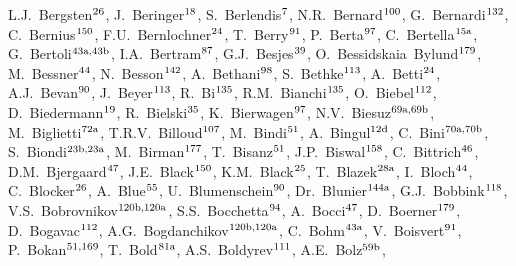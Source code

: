 \begin{flushleft}
L.J.~Bergsten$^\textrm{\scriptsize 26}$,    
J.~Beringer$^\textrm{\scriptsize 18}$,    
S.~Berlendis$^\textrm{\scriptsize 7}$,    
N.R.~Bernard$^\textrm{\scriptsize 100}$,    
G.~Bernardi$^\textrm{\scriptsize 132}$,    
C.~Bernius$^\textrm{\scriptsize 150}$,    
F.U.~Bernlochner$^\textrm{\scriptsize 24}$,    
T.~Berry$^\textrm{\scriptsize 91}$,    
P.~Berta$^\textrm{\scriptsize 97}$,    
C.~Bertella$^\textrm{\scriptsize 15a}$,    
G.~Bertoli$^\textrm{\scriptsize 43a,43b}$,    
I.A.~Bertram$^\textrm{\scriptsize 87}$,    
G.J.~Besjes$^\textrm{\scriptsize 39}$,    
O.~Bessidskaia~Bylund$^\textrm{\scriptsize 179}$,    
M.~Bessner$^\textrm{\scriptsize 44}$,    
N.~Besson$^\textrm{\scriptsize 142}$,    
A.~Bethani$^\textrm{\scriptsize 98}$,    
S.~Bethke$^\textrm{\scriptsize 113}$,    
A.~Betti$^\textrm{\scriptsize 24}$,    
A.J.~Bevan$^\textrm{\scriptsize 90}$,    
J.~Beyer$^\textrm{\scriptsize 113}$,    
R.~Bi$^\textrm{\scriptsize 135}$,    
R.M.~Bianchi$^\textrm{\scriptsize 135}$,    
O.~Biebel$^\textrm{\scriptsize 112}$,    
D.~Biedermann$^\textrm{\scriptsize 19}$,    
R.~Bielski$^\textrm{\scriptsize 35}$,    
K.~Bierwagen$^\textrm{\scriptsize 97}$,    
N.V.~Biesuz$^\textrm{\scriptsize 69a,69b}$,    
M.~Biglietti$^\textrm{\scriptsize 72a}$,    
T.R.V.~Billoud$^\textrm{\scriptsize 107}$,    
M.~Bindi$^\textrm{\scriptsize 51}$,    
A.~Bingul$^\textrm{\scriptsize 12d}$,    
C.~Bini$^\textrm{\scriptsize 70a,70b}$,    
S.~Biondi$^\textrm{\scriptsize 23b,23a}$,    
M.~Birman$^\textrm{\scriptsize 177}$,    
T.~Bisanz$^\textrm{\scriptsize 51}$,    
J.P.~Biswal$^\textrm{\scriptsize 158}$,    
C.~Bittrich$^\textrm{\scriptsize 46}$,    
D.M.~Bjergaard$^\textrm{\scriptsize 47}$,    
J.E.~Black$^\textrm{\scriptsize 150}$,    
K.M.~Black$^\textrm{\scriptsize 25}$,    
T.~Blazek$^\textrm{\scriptsize 28a}$,    
I.~Bloch$^\textrm{\scriptsize 44}$,    
C.~Blocker$^\textrm{\scriptsize 26}$,    
A.~Blue$^\textrm{\scriptsize 55}$,    
U.~Blumenschein$^\textrm{\scriptsize 90}$,    
Dr.~Blunier$^\textrm{\scriptsize 144a}$,    
G.J.~Bobbink$^\textrm{\scriptsize 118}$,    
V.S.~Bobrovnikov$^\textrm{\scriptsize 120b,120a}$,    
S.S.~Bocchetta$^\textrm{\scriptsize 94}$,    
A.~Bocci$^\textrm{\scriptsize 47}$,    
D.~Boerner$^\textrm{\scriptsize 179}$,    
D.~Bogavac$^\textrm{\scriptsize 112}$,    
A.G.~Bogdanchikov$^\textrm{\scriptsize 120b,120a}$,    
C.~Bohm$^\textrm{\scriptsize 43a}$,    
V.~Boisvert$^\textrm{\scriptsize 91}$,    
P.~Bokan$^\textrm{\scriptsize 51,169}$,    
T.~Bold$^\textrm{\scriptsize 81a}$,    
A.S.~Boldyrev$^\textrm{\scriptsize 111}$,    
A.E.~Bolz$^\textrm{\scriptsize 59b}$,    

\end{flushleft}
